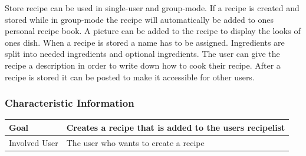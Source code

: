 \documentclass[12pt]{article}
\theoremstyle{definition}
\begin{document}
Store recipe can be used in single-user and group-mode. If a recipe is created and stored while in group-mode the recipe will automatically be added to ones personal recipe book. A picture can be added to the recipe to display the looks of ones dish. When a recipe is stored a name has to be assigned. Ingredients are split into needed ingredients and optional ingredients. The user can give the recipe a description in order to write down how to cook their recipe. After a recipe is stored it can be posted to make it accessible for other users.

\subsubsection{Characteristic Information}

\begin{tabular}{|l|l|}
\hline
Goal & Creates a recipe that is added to the users recipelist  \\ \hline
Involved User & The user who wants to create a recipe \\ \hline
\end{tabular}
\pagebreak
\end{document}
